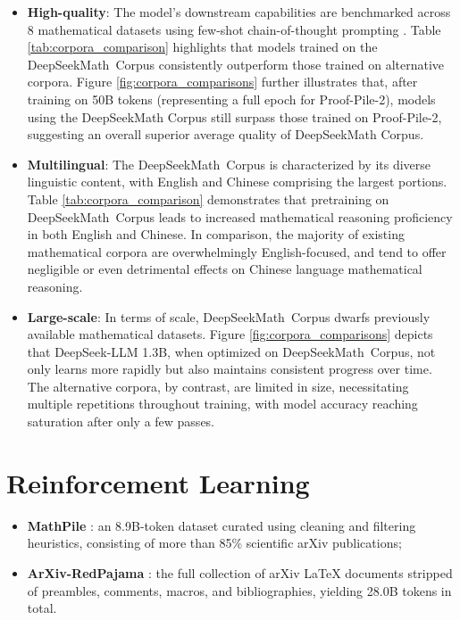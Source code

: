 \begin{itemize}[topsep=0pt]
\begin{itemize}[topsep=0pt]
    \item \textbf{High-quality}:  
    The model's downstream capabilities are benchmarked across 8 mathematical datasets using few-shot chain-of-thought prompting \cite{cot}. Table \ref{tab:corpora_comparison} highlights that models trained on the DeepSeekMath~Corpus consistently outperform those trained on alternative corpora. Figure \ref{fig:corpora_comparisons} further illustrates that, after training on 50B tokens (representing a full epoch for Proof-Pile-2), models using the DeepSeekMath Corpus still surpass those trained on Proof-Pile-2, suggesting an overall superior average quality of DeepSeekMath Corpus.
    \item \textbf{Multilingual}:  
    The DeepSeekMath~Corpus is characterized by its diverse linguistic content, with English and Chinese comprising the largest portions. Table \ref{tab:corpora_comparison} demonstrates that pretraining on DeepSeekMath~Corpus leads to increased mathematical reasoning proficiency in both English and Chinese. In comparison, the majority of existing mathematical corpora are overwhelmingly English-focused, and tend to offer negligible or even detrimental effects on Chinese language mathematical reasoning.
    \item \textbf{Large-scale}:  
    In terms of scale, DeepSeekMath~Corpus dwarfs previously available mathematical datasets. Figure \ref{fig:corpora_comparisons} depicts that DeepSeek-LLM 1.3B, when optimized on DeepSeekMath~Corpus, not only learns more rapidly but also maintains consistent progress over time. The alternative corpora, by contrast, are limited in size, necessitating multiple repetitions throughout training, with model accuracy reaching saturation after only a few passes.
\end{itemize}

\section{Reinforcement Learning}

\begin{itemize}[topsep=0pt]
    \item \textbf{MathPile} \citep{mathpile}: an 8.9B-token dataset curated using cleaning and filtering heuristics, consisting of more than 85\% scientific arXiv publications;
    \item \textbf{ArXiv-RedPajama} \citep{redpajama}: the full collection of arXiv LaTeX documents stripped of preambles, comments, macros, and bibliographies, yielding 28.0B tokens in total.
\end{itemize}


\end{itemize}
